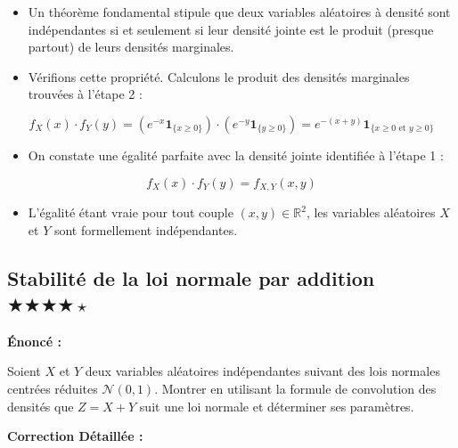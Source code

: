 \documentclass[11pt,a4paper]{article}
\begin{document}
\begin{itemize}
\item Un théorème fondamental stipule que deux variables aléatoires à densité sont indépendantes si et seulement si leur densité jointe est le produit (presque partout) de leurs densités marginales.
\item Vérifions cette propriété. Calculons le produit des densités marginales trouvées à l'étape 2 :
\end{itemize}     $$ f_X(x) \cdot f_Y(y) = \left( e^{-x} \mathbf{1}_{\{x \geq 0\}} \right) \cdot \left( e^{-y} \mathbf{1}_{\{y \geq 0\}} \right) = e^{-(x+y)} \mathbf{1}_{\{x \geq 0 \text{ et } y \geq 0\}} $$
\begin{itemize}
\item On constate une égalité parfaite avec la densité jointe identifiée à l'étape 1 :
\end{itemize}     $$ f_X(x) \cdot f_Y(y) = f_{X,Y}(x,y) $$
\begin{itemize}
\item L'égalité étant vraie pour tout couple $(x,y) \in \mathbb{R}^2$, les variables aléatoires $X$ et $Y$ sont formellement indépendantes.
\end{itemize}

\subsection*{ Stabilité de la loi normale par addition \quad $\bigstar\bigstar\bigstar\bigstar\star$}

\textbf{Énoncé :}

Soient $X$ et $Y$ deux variables aléatoires indépendantes suivant des lois normales centrées réduites $\mathcal{N}(0,1)$.
Montrer en utilisant la formule de convolution des densités que $Z = X + Y$ suit une loi normale et déterminer ses paramètres.

\textbf{Correction Détaillée :}
\end{document}
